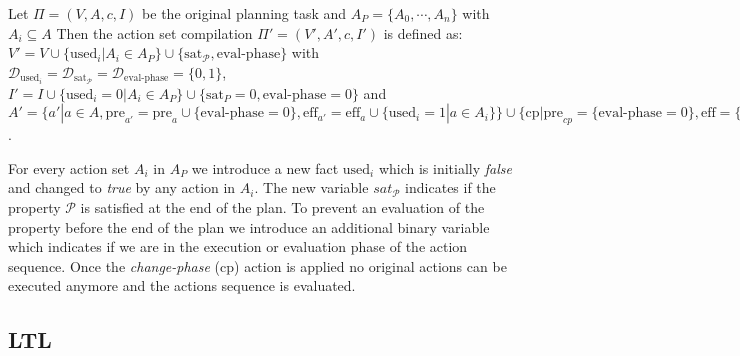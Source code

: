 \begin{definition}
	Let $\Pi = (V, A, c, I)$ be the original planning task and $A_P=\{A_0, \cdots, A_n\}$ 
	with $A_i \subseteq A$ 
	Then the action set compilation $\Pi' = (V', A', c, I')$ is defined as: 
	$V' = V \cup \{\text{used}_i | A_i \in A_P\} \cup \{\text{sat}_{\mathcal{P}}, \text{eval-phase}\}$ 
	with $\mathcal{D}_{\text{used}_i} = \mathcal{D}_{\text{sat}_{\mathcal{P}}} = \mathcal{D}_{\text{eval-phase}} = \{0,1\}$, 
	$I' = I \cup \{\text{used}_i = 0 | A_i \in A_P\} \cup \{\text{sat}_{P} = 0, \text{eval-phase} = 0\}$ 
	and $A' = \{ a' | a \in A, 
	\text{pre}_{a'} = \text{pre}_{a} \cup \{\text{eval-phase} = 0\} , \text{eff}_{a'} = \text{eff}_a \cup \{\text{used}_i = 1 | a \in A_i\}\} \cup 
	\{\text{cp} | \text{pre}_{cp} = \{\text{eval-phase} = 0\}, \text{eff} = \{\text{eval-phase} = 1 \}\} \cup 
	\{\text{actions to eval } \mathcal{P}\}$. 
\end{definition}

For every action set $A_i$ in $A_P$ we introduce a new fact $\text{used}_i$ which is initially 
\emph{false} and changed to \emph{true} by any action in $A_i$. The new variable $sat_{\mathcal{P}}$ indicates 
if the property $\mathcal{P}$ is satisfied at the end of the plan. To prevent an 
evaluation of the property before the end of the plan we introduce an additional binary variable
which indicates if we are in the execution or evaluation phase of the action sequence. Once the \textit{change-phase} (cp) action
is applied no original actions can be executed anymore and the actions sequence is evaluated.


\subsection{LTL}



